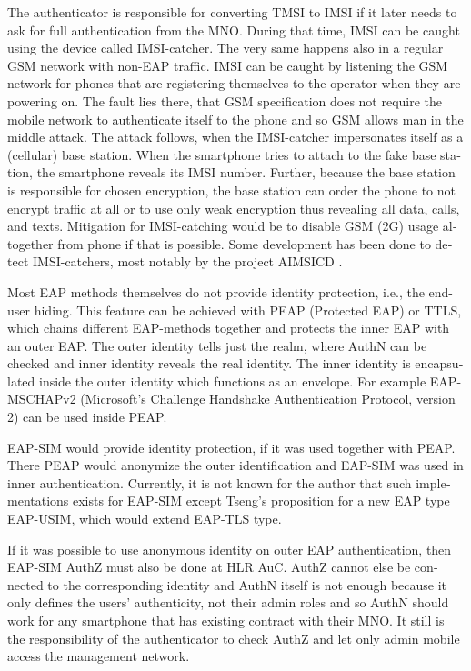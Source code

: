\documentclass[12pt,a4paper,english]{tutthesis}
\begin{document}
\begin{otherlanguage}{english}
The authenticator is responsible for converting TMSI to IMSI if it
later needs to ask for full authentication from the MNO. During that
time, IMSI can be caught using the device called IMSI-catcher.  The
very same happens also in a regular GSM network with non-EAP traffic.
IMSI can be caught by listening the GSM network for phones that are
registering themselves to the operator when they are powering on.  The
fault lies there, that GSM specification does not require the mobile
network to authenticate itself to the phone and so GSM allows man in
the middle attack.  The attack follows, when the IMSI-catcher
impersonates itself as a (cellular) base station.  When the smartphone
tries to attach to the fake base station, the smartphone reveals its
IMSI number. Further, because the base station is responsible for
chosen encryption, the base station can order the phone to not encrypt
traffic at all or to use only weak encryption thus revealing all data,
calls, and texts. Mitigation for IMSI-catching would be to disable GSM
(2G) usage altogether from phone if that is
possible\cite{imsi-heise}. Some development has been done to detect
IMSI-catchers, most notably by the project AIMSICD \cite{aimcid}.


Most EAP methods themselves do not provide identity protection, i.e., the
end-user hiding.
This feature can be achieved with PEAP (Protected EAP) or TTLS, which
chains different EAP-methods together and protects the inner EAP with
an outer EAP. 
The outer identity tells just the realm, where AuthN can be checked
and inner identity reveals the real identity.  The inner identity is
encapsulated inside the outer identity which functions as an
envelope. 
For example EAP-MSCHAPv2 (Microsoft's Challenge
Handshake Authentication Protocol, version 2) can be used inside PEAP.


EAP-SIM would provide identity protection, if it was used together
with PEAP. There PEAP would anonymize the outer identification  and
EAP-SIM was used in inner authentication.
Currently, it is not known for the author that such implementations exists for
EAP-SIM  except Tseng's proposition \cite{tseng-usim} for a new EAP type
EAP-USIM, which would extend EAP-TLS type.

If it was possible to use anonymous identity on outer EAP
authentication, then EAP-SIM AuthZ must also be done at HLR AuC.
AuthZ cannot else be connected to the corresponding
identity and AuthN itself is not enough because it only defines the users'
authenticity, not their admin roles and so 
AuthN should work for any  smartphone that has existing contract with
their MNO. 
It still is the responsibility of the authenticator to 
check AuthZ  and let only admin mobile access the management network.


\end{otherlanguage}
\end{document}
